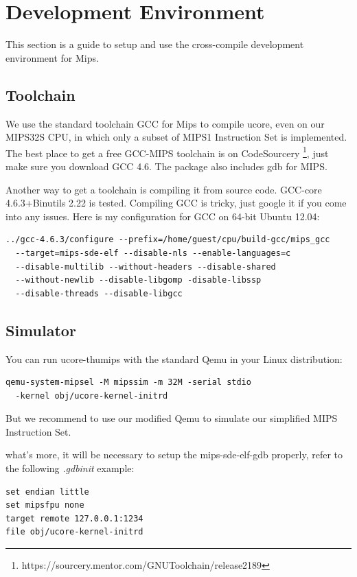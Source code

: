 \documentclass[a4paper]{article}
\begin{document}
\section{Development Environment}
This section is a guide to setup and use the cross-compile development environment for Mips.

\subsection{Toolchain}
We use the standard toolchain GCC for Mips to compile ucore, even on our 
MIPS32S CPU, in which only a subset of MIPS1 Instruction Set is implemented.
The best place to get a free GCC-MIPS toolchain is on CodeSourcery
\footnote{https://sourcery.mentor.com/GNUToolchain/release2189}, just make sure you download GCC 4.6. The package also includes gdb for MIPS.

Another way to get a toolchain is compiling it from source code. GCC-core 4.6.3+Binutils 2.22 is tested. Compiling GCC is tricky, just google it if you
come into any issues. Here is my configuration for GCC on 64-bit Ubuntu 12.04:

\begin{verbatim}
../gcc-4.6.3/configure --prefix=/home/guest/cpu/build-gcc/mips_gcc 
  --target=mips-sde-elf --disable-nls --enable-languages=c  
  --disable-multilib --without-headers --disable-shared
  --without-newlib --disable-libgomp -disable-libssp 
  --disable-threads --disable-libgcc
\end{verbatim}


\subsection{Simulator}
You can run ucore-thumips with the standard Qemu in your Linux distribution:

\begin{verbatim}
qemu-system-mipsel -M mipssim -m 32M -serial stdio 
  -kernel obj/ucore-kernel-initrd
\end{verbatim}

But we recommend to use our modified Qemu to simulate our simplified MIPS Instruction Set. 

what's more, it will be necessary to setup the mips-sde-elf-gdb properly, refer to 
the following \emph{.gdbinit} example:

\begin{verbatim}
set endian little
set mipsfpu none
target remote 127.0.0.1:1234
file obj/ucore-kernel-initrd
\end{verbatim}
\end{document}
